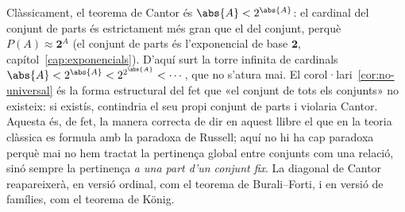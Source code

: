 \begin{observacio}\label{obs:cantor-classica}
Clàssicament, el teorema de Cantor és \(\abs{A}<2^{\abs{A}}\): el cardinal
del conjunt de parts és estrictament més gran que el del conjunt, perquè
\(P(A)\approx\mathbf2^{A}\) (el conjunt de parts és l'exponencial de base
\(\mathbf2\), capítol~\ref{cap:exponencials}). D'aquí surt la torre infinita
de cardinals \(\abs{A}<2^{\abs{A}}<2^{2^{\abs{A}}}<\cdots\), que no s'atura
mai. El corol·lari~\ref{cor:no-universal} és la forma estructural del fet que
«el conjunt de tots els conjunts» no existeix: si existís, contindria el seu
propi conjunt de parts i violaria Cantor. Aquesta és, de fet, la manera
correcta de dir en aquest llibre el que en la teoria clàssica es formula amb
la paradoxa de Russell; aquí no hi ha cap paradoxa perquè mai no hem tractat
la pertinença global entre conjunts com una relació, sinó sempre la
pertinença \emph{a una part d'un conjunt fix}. La diagonal de Cantor
reapareixerà, en versió ordinal, com el teorema de Burali--Forti, i en versió
de famílies, com el teorema de König.
\end{observacio}

